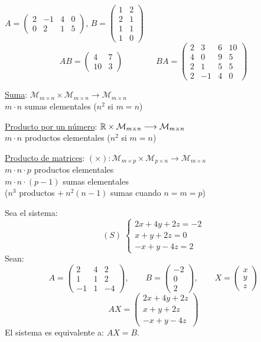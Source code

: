 \documentclass[11pt,a4paper]{article}
\newcommand{\M}{\mathcal{M}}
\begin{document}
\begin{ejemplo}
$A=\begin{pmatrix}2&-1&4&0\\0&2&1&5\end{pmatrix}$, \quad
$B=\begin{pmatrix}1&2\\2&1\\1&1\\1&0\end{pmatrix}$
\[
AB=\begin{pmatrix}4&7\\10&3\end{pmatrix}\qquad\qquad
BA=\begin{pmatrix}2&3&6&10\\4&0&9&5\\2&1&5&5\\2&-1&4&0\end{pmatrix}
\]
\end{ejemplo}

\underline{Suma}: $\M_{m\times n}\times\M_{m\times n}\longrightarrow\M_{m\times n}$\\
$m\cdot n$ sumas elementales ($n^2$ si $m=n$)

\underline{Producto por un número}: $\R\times\M_{m\times n}\longrightarrow\M_{m\times n}$\\
$m\cdot n$ productos elementales ($n^2$ si $m=n$)

\underline{Producto de matrices}: $(\times):\M_{m\times p}\times\M_{p\times n}\longrightarrow\M_{m\times n}$\\
$m\cdot n\cdot p$ productos elementales\\
$m\cdot n\cdot(p-1)$ sumas elementales\\
($n^3$ productos $+\ n^2(n-1)$ sumas cuando $n=m=p$)

\begin{ejemplo}
Sea el sistema:
\[
(S)\;\begin{cases}
2x+4y+2z=-2\\
x+y+2z=0\\
-x+y-4z=2
\end{cases}
\]
Sean:
\[
A=\begin{pmatrix}2&4&2\\1&1&2\\-1&1&-4\end{pmatrix},\qquad
B=\begin{pmatrix}-2\\0\\2\end{pmatrix},\qquad
X=\begin{pmatrix}x\\y\\z\end{pmatrix}
\]
\[
AX=\begin{pmatrix}2x+4y+2z\\x+y+2z\\-x+y-4z\end{pmatrix}
\]
El sistema es equivalente a: $AX=B$.
\end{ejemplo}
\end{document}
